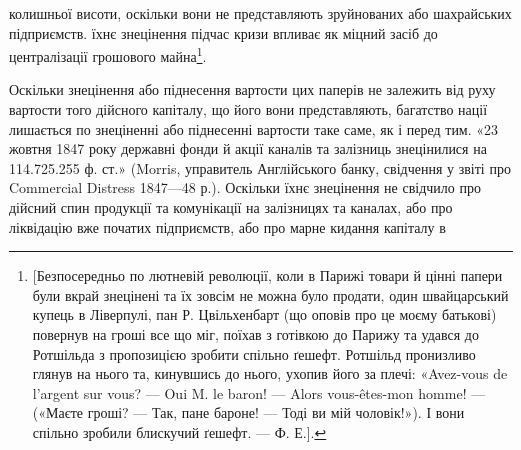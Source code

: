 колишньої висоти, оскільки вони не представляють зруйнованих або шахрайських
підприємств. їхнє знецінення підчас кризи впливає як міцний засіб до централізації
грошового майна\footnote{[Безпосередньо по лютневій революції, коли в Парижі товари й цінні папери були вкрай
знецінені та їх зовсім не можна було продати, один швайцарський купець в Ліверпулі, пан Р.
Цвільхенбарт
(що оповів про це моєму батькові) повернув на гроші все що міг, поїхав з готівкою до Парижу
та удався до Ротшільда з пропозицією зробити спільно ґешефт. Ротшільд пронизливо глянув на нього та,
кинувшись до нього, ухопив його за плечі: «Avez-vous de l’argent sur vous? — Oui M. le baron! —
Alors vous-êtes-mon homme! — («Маєте гроші? — Так, пане бароне! — Тоді ви мій чоловік!»).
І вони спільно зробили блискучий ґешефт. — Ф. Е.].}.

Оскільки знецінення або піднесення вартости цих паперів не залежить
від руху вартости того дійсного капіталу, що його вони представляють, багатство
нації лишається по знеціненні або піднесенні вартости таке саме, як і перед
тим. «23 жовтня 1847 року державні фонди й акції каналів та залізниць знецінилися
на 114.725.255 ф. ст.» (Morris, управитель Англійського банку, свідчення
у звіті про Commercial Distress 1847—48 р.). Оскільки їхнє знецінення не
свідчило про дійсний спин продукції та комунікації на залізницях та каналах,
або про ліквідацію вже початих підприємств, або про марне кидання капіталу в
\parbreak{}  %
